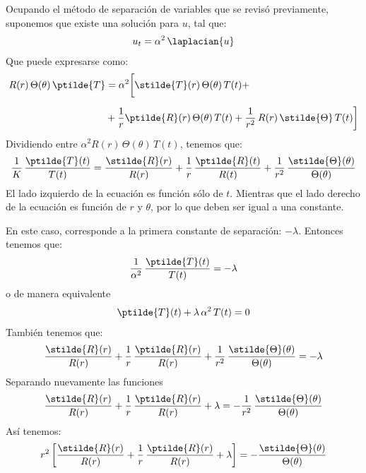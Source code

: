 Ocupando el método de separación de variables que se revisó previamente, suponemos que existe una solución para $u$, tal que:
\begin{align*}
u_{t} = \alpha^{2} \, \laplacian{u}
\end{align*}
Que puede expresarse como:
\begin{align*}
R(r) \, \Theta (\theta) \, \ptilde{T} &= \alpha^{2} \bigg[ \stilde{T} (r) \, \Theta (\theta) \, T(t) + \\[0.5em]
&+ \dfrac{1}{r} \ptilde{R} (r) \, \Theta(\theta) \, T(t) + \dfrac{1}{r^{2}} \, R(r) \, \stilde{\Theta} \, T(t) \bigg]
\end{align*}
Dividiendo entre $\alpha^{2} R(r) \, \Theta (\theta) \, T(t)$, tenemos que:
\begin{align}
\dfrac{1}{K} \, \dfrac{\ptilde{T} (t)}{T (t)} = \dfrac{\stilde{R} (r)}{R (r)} + \dfrac{1}{r} \, \dfrac{\ptilde{R} (t)}{R (t)} + \dfrac{1}{r^{2}} \, \dfrac{\stilde{\Theta} (\theta)}{\Theta (\theta)}
\label{eq:ecuacion_K01}
\end{align}
El lado izquierdo de la ecuación es función sólo de $t$. Mientras que el lado derecho de la ecuación es función de $r$ y $\theta$, por lo que deben ser igual a una constante.
\par
En este caso, corresponde a la primera constante de separación: $- \lambda$. Entonces tenemos que:
\begin{align*}
\dfrac{1}{\alpha^{2}} \, \dfrac{\ptilde{T} (t)}{T (t)} = - \lambda
\end{align*}
o de manera equivalente
\begin{align}
\ptilde{T}(t) + \lambda \, \alpha^{2} \, T(t) = 0
\label{eq:ecuacion_K02}    
\end{align}
También tenemos que:
\begin{align*}
\dfrac{\stilde{R} (r)}{R (r)} + \dfrac{1}{r} \, \dfrac{\ptilde{R} (r)}{R (r)} + \dfrac{1}{r^{2}} \, \dfrac{\stilde{\Theta} (\theta)}{\Theta (\theta)} = - \lambda
\end{align*}
Separando nuevamente las funciones
\begin{align*}
\dfrac{\stilde{R} (r)}{R (r)} + \dfrac{1}{r} \, \dfrac{\ptilde{R} (r)}{R (r)} + \lambda = - \dfrac{1}{r^{2}} \, \dfrac{\stilde{\Theta} (\theta)}{\Theta (\theta)}
\end{align*}
Así tenemos:
\begin{align}
r^{2} \left[ \dfrac{\stilde{R} (r)}{R (r)} + \dfrac{1}{r} \, \dfrac{\ptilde{R} (r)}{R (r)} + \lambda \right] = - \dfrac{\stilde{\Theta} (\theta)}{\Theta (\theta)}
\label{eq:ecuacion_K03}    
\end{align}
